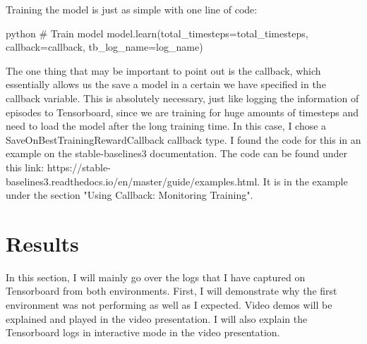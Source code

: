 \documentclass{article}
\numberwithin{equation}{section}
\numberwithin{equation}{section}
\begin{document}
Training the model is just as simple with one line of code:

\begin{mintedbox}{python}
# Train model
model.learn(total_timesteps=total_timesteps, callback=callback, tb_log_name=log_name)
\end{mintedbox}

The one thing that may be important to point out is the callback, which essentially allows us the save a model in a certain we have specified in the callback variable. This is absolutely necessary, just like logging the information of episodes to Tensorboard, since we are training for huge amounts of timesteps and need to load the model after the long training time. In this case, I chose a SaveOnBestTrainingRewardCallback callback type. I found the code for this in an example on the stable-baselines3 documentation. The code can be found under this link: https://stable-baselines3.readthedocs.io/en/master/guide/examples.html. It is in the example under the section "Using Callback: Monitoring Training".






\section*{Results}
In this section, I will mainly go over the logs that I have captured on Tensorboard from both environments. First, I will demonstrate why the first environment was not performing as well as I expected. Video demos will be explained and played in the video presentation. I will also explain the Tensorboard logs in interactive mode in the video presentation.
\end{document}
